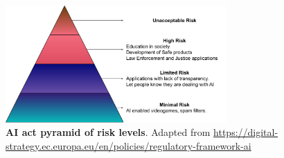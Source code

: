 \begin{figure}[H]
    \centering
    \includegraphics[width=0.75\textwidth]{fig/rel/images/AI_act_pyramid.pdf}
    \caption{\textbf{AI act pyramid of risk levels}. Adapted from \url{https://digital-strategy.ec.europa.eu/en/policies/regulatory-framework-ai}}
    \label{fig:rel_AIact}
\end{figure}